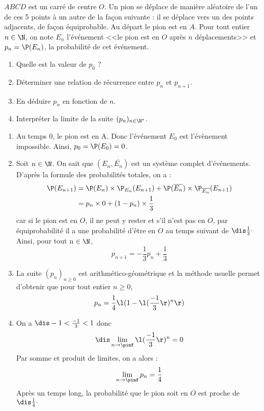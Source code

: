 \documentclass[a4paper,10pt]{report}
\begin{document}
\everymath{\displaystyle}

\begin{center}
\end{center}

\begin{Exa} $ABCD$ est un carré de centre $O$. Un pion se déplace de manière aléatoire de l'un de ces 5 points à un autre de la façon suivante : il se déplace vers un des points adjacents, de façon équiprobable. Au départ le pion est en $A$. Pour tout entier $n \in \N$, on note $E_n$ l'événement <<le pion est en $O$ après $n$ déplacements>> et $p_n = \P(E_n)$, la probabilité de cet événement.
\begin{center}\end{center}
\begin{enumerate}
 \item Quelle est la valeur de $p_0$ ?
 \item Déterminer une relation de récurrence entre $p_n$ et $p_{n+1}$.
 \item En déduire $p_n$ en fonction de $n$.
 \item Interpréter la limite de la suite $(p_n)_{n\in \N^*}$.
\end{enumerate}
\end{Exa}

\corr \begin{enumerate}
\item Au temps 0, le pion est en A. Donc l'événement $E_0$ est l'évènement impossible. Ainsi, $p_0=\P(E_0)=0$.

\item Soit $n\in \N$. On sait que $(E_n, \overline{E_n})$ est un système complet d'événements. D'après la formule des probabilités totales, on a :
\begin{align*}
 \P(E_{n+1}) &= \P(E_n) \times \P_{E_n}(E_{n+1}) + \P(\overline{E_n}) \times \P_{\overline{E_n}}(E_{n+1})\\
 &= p_n \times 0 + (1-p_n) \times \frac 13
\end{align*}
car si le pion est en $O$, il ne peut y rester et s'il n'est pas en $O$, par équiprobabilité il a une probabilité d'être en $O$ au temps suivant de $\dis \frac 13 \cdot$ Ainsi, pour tout n $\in \N$, 
$$p_{n+1} = -\frac 13 p_n + \frac 13$$

\item La suite $(p_n)_{n \geq 0}$ est arithmético-géométrique et la méthode usuelle permet d'obtenir que pour tout entier $n \geq 0$,
$$ p_n = \frac 14 \l( 1 - \l(\frac{-1}{3}\r)^n\r) $$
\item On a $\dis -1 < \frac{-1}{3}<1$ donc 
$$\dis \lim_{n\to \pinf} \l(\frac{-1}{3}\r)^n = 0$$
Par somme et produit de limites, on a alors :
\[ \lim_{n\to \pinf} p_n = \frac 14 \]
Après un temps long, la probabilité que le pion soit en $O$ est proche de $ \dis \frac 14 \cdot$
\end{enumerate}
\end{document}

